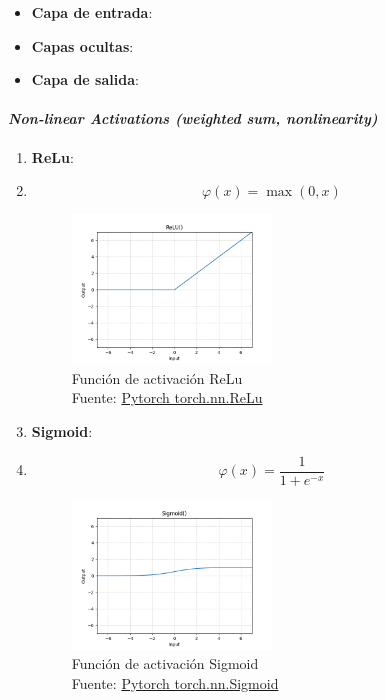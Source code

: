 \begin{itemize}
    \item \textbf{Capa de entrada}:
    \item \textbf{Capas ocultas}:
    \item \textbf{Capa de salida}:
\end{itemize}





\paragraph*{\textit{Non-linear Activations (weighted sum, nonlinearity)} \cite{pytorch2024github}}

\begin{enumerate}
    \item \textbf{ReLu}:
    \item[] \begin{equation} \varphi(x) = \operatorname*{max}(0,x) \end{equation}
        \begin{figure}[H]
            \centering
            \includegraphics[width=0.5\textwidth]{figures/equations/ReLu.png}
            \caption{Función de activación ReLu\\Fuente: \href{https://pytorch.org/docs/stable/generated/torch.nn.ReLu.html}{Pytorch torch.nn.ReLu}}
            \label{fig:torch.nn.ReLu}
        \end{figure}

    \item \textbf{Sigmoid}:
    \item[] \begin{equation} \varphi(x) = \frac{1}{1+e^{-x}} \end{equation}
        \begin{figure}[H]
            \centering
            \includegraphics[width=0.5\textwidth]{figures/equations/Sigmoid.png}
            \caption{Función de activación Sigmoid\\Fuente: \href{https://pytorch.org/docs/stable/generated/torch.nn.Sigmoid.html}{Pytorch torch.nn.Sigmoid}}
            \label{fig:torch.nn.Sigmoid}
        \end{figure}


\end{enumerate}
